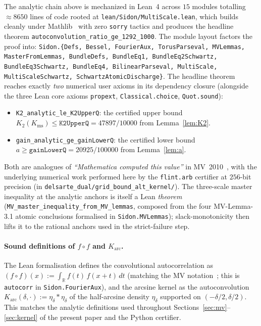 \documentclass[11pt, letterpaper]{article}
\theoremstyle{paperplain}
\theoremstyle{paperdef}
\newcommand{\R}{\mathbb{R}}
\newcommand{\Karc}{K_{\mathrm{arc}}}
\newcommand{\Kms}{K_{\mathrm{ms}}}
\begin{document}
The analytic chain above is mechanized in Lean~4 across $15$ modules
totalling $\approx 8650$ lines of code rooted at
\texttt{lean/Sidon/MultiScale.lean}, which builds cleanly under
Mathlib~\cite{Mathlib,Lean} with zero \texttt{sorry} tactics and
produces the headline theorem
\texttt{autoconvolution\_ratio\_ge\_1292\_1000}.  The module layout
factors the proof into:
\texttt{Sidon.\{Defs, Bessel, FourierAux, TorusParseval, MVLemmas,
MasterFromLemmas, BundleDefs, BundleEq1, BundleEq2Schwartz,
BundleEq3Schwartz, BundleEq4, BilinearParseval, MultiScale,
MultiScaleSchwartz, SchwartzAtomicDischarge\}}.
The headline theorem reaches exactly \emph{two} numerical user axioms
in its dependency closure (alongside the three Lean core axioms
\texttt{propext}, \texttt{Classical.choice}, \texttt{Quot.sound}):
\begin{itemize}[leftmargin=2em]
\item \texttt{K2\_analytic\_le\_K2UpperQ}: the certified upper bound
$K_2(\Kms)\le\texttt{K2UpperQ}=47897/10000$ from
Lemma~\ref{lem:K2}.
\item \texttt{gain\_analytic\_ge\_gainLowerQ}: the certified lower bound
$a\ge\texttt{gainLowerQ}=20925/100000$ from Lemma~\ref{lem:a}.
\end{itemize}
Both are analogues of \emph{``Mathematica computed this value''} in
MV~2010~\cite{MV10}, with the underlying numerical work performed
here by the \texttt{flint.arb} certifier at $256$-bit precision (in
\texttt{delsarte\_dual/grid\_bound\_alt\_kernel/}).  The three-scale
master inequality at the analytic anchors is itself a Lean
\emph{theorem} (\texttt{MV\_master\_inequality\_from\_MV\_lemmas},
composed from the four MV-Lemma-3.1 atomic conclusions formalised in
\texttt{Sidon.MVLemmas}); slack-monotonicity then lifts it to the
rational anchors used in the strict-failure step.

\paragraph{Sound definitions of \texorpdfstring{$f\circ f$}{f circ f}
and \texorpdfstring{$\Karc$}{K\_arc}.}
The Lean formalisation defines the convolutional autocorrelation as
$(f\circ f)(x):=\int_{\R}f(t)\,f(x+t)\,dt$ (matching the MV
notation~\cite[\S 3]{MV10}; this is \texttt{autocorr} in
\texttt{Sidon.FourierAux}), and the arcsine kernel as the
autoconvolution $\Karc(\delta,\cdot):=\eta_\delta*\eta_\delta$ of the
half-arcsine density $\eta_\delta$ supported on
$(-\delta/2,\delta/2)$.  This matches the analytic definitions used
throughout Sections~\ref{sec:mv}--\ref{sec:kernel} of the present
paper and the Python certifier.
\end{document}
